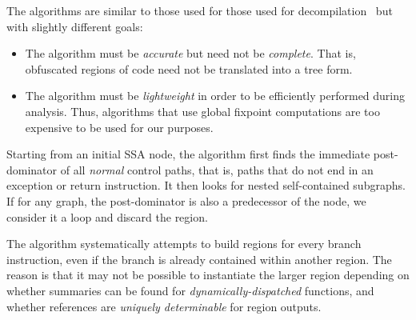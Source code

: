 The algorithms are similar to those used for those used for decompilation~\cite{Yakdan15@decompilation} but with slightly different goals: 
\begin{itemize}
    \item The algorithm must be {\em accurate} but need not be {\em complete}.  That is, obfuscated regions of code need not be translated into a tree form.
    \item The algorithm must be {\em lightweight} in order to be efficiently performed during analysis.  Thus, algorithms that use global fixpoint computations are 
        too expensive to be used for our purposes.
\end{itemize}

Starting from an initial SSA node, the algorithm first finds the immediate post-dominator of all {\em normal} control paths, that is, paths that do not end in an exception or return instruction.  It then looks for nested self-contained subgraphs.  If for any graph, the post-dominator is also a predecessor of the node, we consider it a loop and discard the region.  

The algorithm systematically attempts to build regions for every branch instruction, even if the branch is already contained within another region.  The reason is that it may not be possible to instantiate the larger region depending on whether summaries can be found for {\em dynamically-dispatched} functions, and whether references are {\em uniquely determinable} for region outputs.

